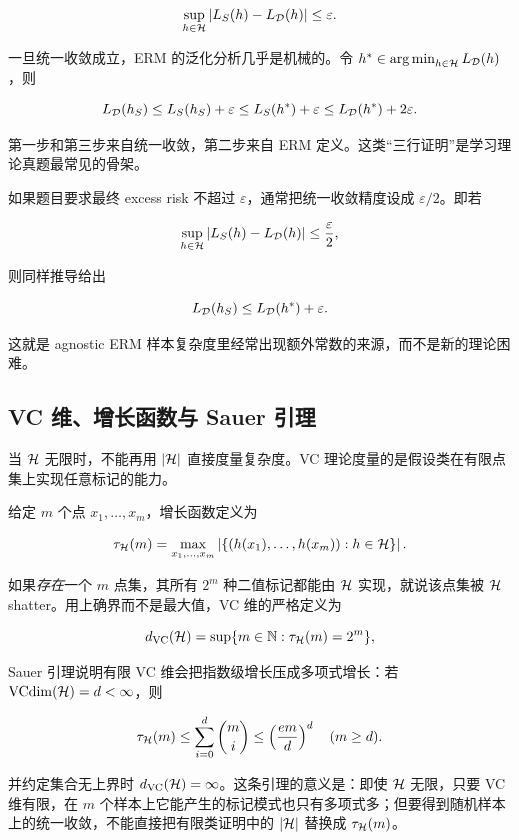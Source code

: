 \documentclass[11pt]{ctexart}
\begin{document}
\[
  \sup_{h\in\mathcal{H}}
  |L_S(h)-L_{\mathcal{D}}(h)|
  \le \varepsilon.
\]

一旦统一收敛成立，ERM 的泛化分析几乎是机械的。令 \(h^*\in\operatorname*{arg\,min}_{h\in\mathcal{H}}L_{\mathcal{D}}(h)\)，则

\[
  L_{\mathcal{D}}(h_S)
  \le L_S(h_S)+\varepsilon
  \le L_S(h^*)+\varepsilon
  \le L_{\mathcal{D}}(h^*)+2\varepsilon.
\]

第一步和第三步来自统一收敛，第二步来自 ERM 定义。这类“三行证明”是学习理论真题最常见的骨架。

如果题目要求最终 excess risk 不超过 \(\varepsilon\)，通常把统一收敛精度设成 \(\varepsilon/2\)。即若

\[
  \sup_{h\in\mathcal{H}}
  |L_S(h)-L_{\mathcal{D}}(h)|
  \le \frac{\varepsilon}{2},
\]

则同样推导给出

\[
  L_{\mathcal{D}}(h_S)
  \le
  L_{\mathcal{D}}(h^*)+\varepsilon.
\]

这就是 agnostic ERM 样本复杂度里经常出现额外常数的来源，而不是新的理论困难。

\subsection{VC 维、增长函数与 Sauer 引理}




当 \(\mathcal{H}\) 无限时，不能再用 \(|\mathcal{H}|\) 直接度量复杂度。VC 理论度量的是假设类在有限点集上实现任意标记的能力。

\begin{definition}
给定 \(m\) 个点 \(x_1,\ldots,x_m\)，增长函数定义为

\[
  \tau_{\mathcal{H}}(m)
  =
  \max_{x_1,\ldots,x_m}
  \left|
  \{
    (h(x_1),\ldots,h(x_m)):h\in\mathcal{H}
  \}
  \right|.
\]
\end{definition}


如果\emph{存在}一个 \(m\) 点集，其所有 \(2^m\) 种二值标记都能由 \(\mathcal{H}\) 实现，就说该点集被 \(\mathcal{H}\) shatter。用上确界而不是最大值，VC 维的严格定义为

\[
  d_{\mathrm{VC}}(\mathcal{H})
  =
  \sup\{m\in\mathbb{N}:\tau_{\mathcal{H}}(m)=2^m\},
\]

Sauer 引理说明有限 VC 维会把指数级增长压成多项式增长：若 \(\operatorname{VCdim}(\mathcal{H})=d<\infty\)，则

\[
  \tau_{\mathcal{H}}(m)
  \le
  \sum_{i=0}^{d}\binom{m}{i}
  \le
  \left(\frac{em}{d}\right)^d
  \quad (m\ge d).
\]

并约定集合无上界时 \(d_{\mathrm{VC}}(\mathcal{H})=\infty\)。这条引理的意义是：即使 \(\mathcal{H}\) 无限，只要 VC 维有限，在 \(m\) 个样本上它能产生的标记模式也只有多项式多；但要得到随机样本上的统一收敛，不能直接把有限类证明中的 \(|\mathcal{H}|\) 替换成 \(\tau_{\mathcal{H}}(m)\)。
\end{document}
